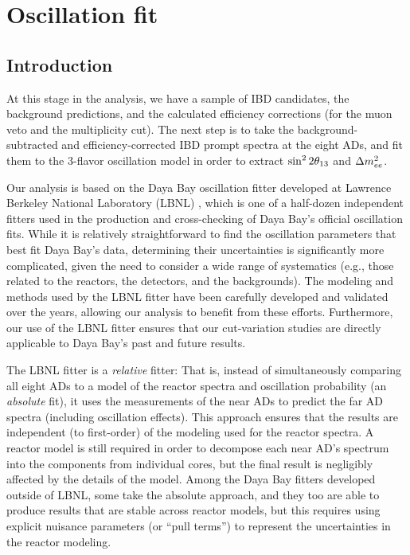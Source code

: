 \documentclass[../thesis.tex]{subfiles}
\begin{document}
\chapter{Oscillation fit}
\label{chap:fitting}

\section{Introduction}
\label{sec:fittingIntro}

At this stage in the analysis, we have a sample of IBD candidates, the background predictions, and the calculated efficiency corrections (for the muon veto and the multiplicity cut). The next step is to take the background-subtracted and efficiency-corrected IBD prompt spectra at the eight ADs, and fit them to the 3-flavor oscillation model in order to extract $\sin^2 2\theta_{13}$ and $\Delta m^2_{ee}$.

Our analysis is based on the Daya Bay oscillation fitter developed at Lawrence Berkeley National Laboratory (LBNL) \cite{berkeley_shapefit,berkeley_toymc}, which is one of a half-dozen independent fitters used in the production and cross-checking of Daya Bay's official oscillation fits. While it is relatively straightforward to find the oscillation parameters that best fit Daya Bay's data, determining their uncertainties is significantly more complicated, given the need to consider a wide range of systematics (e.g., those related to the reactors, the detectors, and the backgrounds). The modeling and methods used by the LBNL fitter have been carefully developed and validated over the years, allowing our analysis to benefit from these efforts. Furthermore, our use of the LBNL fitter ensures that our cut-variation studies are directly applicable to Daya Bay's past and future results.

The LBNL fitter is a \emph{relative} fitter: That is, instead of simultaneously comparing all eight ADs to a model of the reactor spectra and oscillation probability (an \emph{absolute} fit), it uses the measurements of the near ADs to predict the far AD spectra (including oscillation effects). This approach ensures that the results are independent (to first-order) of the modeling used for the reactor spectra. A reactor model is still required in order to decompose each near AD's spectrum into the components from individual cores, but the final result is negligibly affected by the details of the model. Among the Daya Bay fitters developed outside of LBNL, some take the absolute approach, and they too are able to produce results that are stable across reactor models, but this requires using explicit nuisance parameters (or ``pull terms'') to represent the uncertainties in the reactor modeling.
\end{document}
